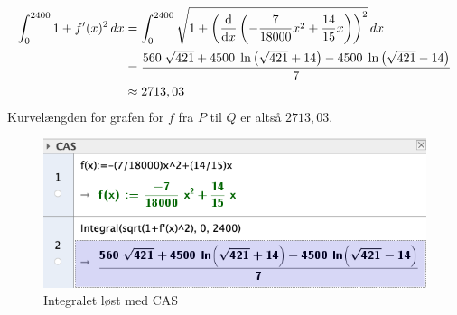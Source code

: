 \documentclass{article}
\begin{document}
\begin{equation*}
\begin{split}
  \int_{0}^{2400} 1+f'(x)^2 \,dx &= \int_{0}^{2400} \sqrt{1+\left(\dv{x} \left(-\frac{7}{18000}x^2+\frac{14}{15}x\right)\right)^2 }  \,dx \\
  &=\frac{560 \; \sqrt{421} + 4500 \; \ln\left(\sqrt{421} + 14 \right) - 4500 \; \ln\left(\sqrt{421} - 14 \right)}{7}\\ 
  &\approx 2713,03
\end{split}
\end{equation*}
Kurvelængden for grafen for $f$ fra $P$ til $Q$ er altså $2713,03$. 
\begin{figure}[H]
\begin{center}
  \includegraphics[scale=0.7]{CAS.png}
\end{center}
\caption{Integralet løst med CAS}
\label{fig:CAS}
\end{figure}
\end{document}
